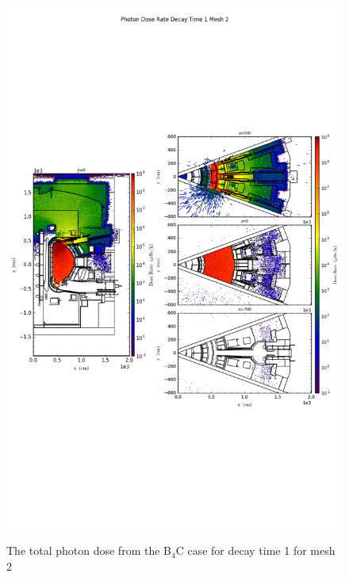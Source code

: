 \begin{figure}[ht!]
\centering
\includegraphics[trim={0cm 9cm 0cm 10cm},clip,scale=0.75]{../plots/final_model_nob4c/Photon_Dose_Rate_Decay_Time_1_Mesh_2.png}
\label{fig:photons_dc1_no4bc_m2_flux}
\caption{The total photon dose from the B$_4$C case for decay time 1 for mesh 2}
\end{figure}
